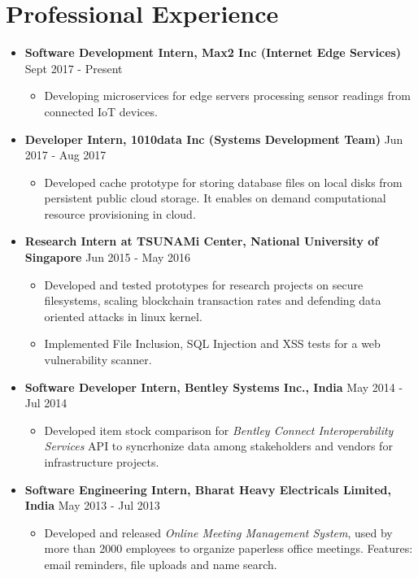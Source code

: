 \documentclass{article}
\newcommand{\bi}{\vspace{-1mm}\begin{itemize}[align=left,leftmargin=*, rightmargin=80pt, labelindent=0pt,labelsep=2pt, label={-}, nosep]}
\newcommand{\ei}{\end{itemize}}
\begin{document}
\section*{Professional Experience}
\begin{itemize}

    \item \textbf{Software Development Intern, Max2 Inc (Internet Edge Services)} {\hfill Sept 2017 - Present}
    \bi
        \item Developing microservices for edge servers processing sensor readings from connected IoT devices.
    \ei

    \item \textbf{Developer Intern, 1010data Inc (Systems Development Team)} {\hfill Jun 2017 - Aug 2017}
    \bi
        \item Developed cache prototype for storing database files on local disks from persistent public cloud storage. It enables on demand computational resource provisioning in cloud.
    \ei

    \item \textbf{Research Intern at TSUNAMi Center, National University of Singapore} {\hfill Jun 2015 - May 2016}
    \bi
        \item Developed and tested prototypes for research projects on secure filesystems, scaling blockchain transaction rates and defending data oriented attacks in linux kernel.

        \item Implemented File Inclusion, SQL Injection and XSS tests for a web vulnerability scanner.
    \ei
    
    \item \textbf{Software Developer Intern, Bentley Systems Inc., India} {\hfill May 2014 - Jul 2014}
    \bi
        \item Developed item stock comparison for \textit{Bentley Connect Interoperability Services} API to syncrhonize data among stakeholders and vendors for infrastructure projects.
    \ei

    \item \textbf{Software Engineering Intern, Bharat Heavy Electricals Limited, India} {\hfill May 2013 - Jul 2013}
    \bi
        \item Developed and released \textit{Online Meeting Management System}, used by more than 2000 employees to organize paperless office meetings. Features: email reminders, file uploads and name search.
    \ei 
\end{itemize}
\end{document}
